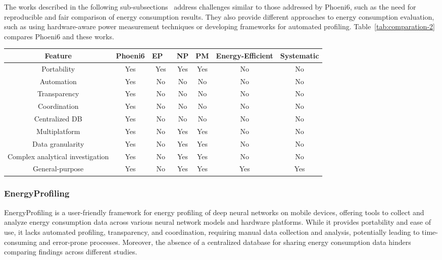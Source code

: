 The works described in the following sub-subsections~\cite{liu2022energyprofiling,li2022neuralpower,chen2021powermeter,zhang2021energyefficient,wang2020systematic} address challenges similar to those addressed by Phoeni6, such as the need for reproducible and fair comparison of energy consumption results. They also provide different approaches to energy consumption evaluation, such as using hardware-aware power measurement techniques or developing frameworks for automated profiling. Table~\ref{tab:comparation-2} compares Phoeni6 and these works.

\begin{table*}[htbp]
\centering
\caption{Feature comparison between Phoeni6 and other frameworks, emphasizing advantages in portability and automation. EP = EnergyProfilin, NP = NeuralPower, PM = PowerMete.}
\begin{tabular}{|c|c|c|c|c|c|c|}
\hline
Feature & Phoeni6 & EP ~\cite{liu2022energyprofiling}& NP\cite{li2022neuralpower} & PM \cite{chen2021powermeter}& Energy-Efficient \cite{zhang2021energyefficient} & Systematic \cite{wang2020systematic}\\
\hline
Portability & Yes & Yes & Yes & Yes & No & No \\\hline
Automation & Yes & No & No & No & No & No \\\hline
Transparency & Yes & No & No & No & No & No \\\hline
Coordination & Yes & No & No & No & No & No \\\hline
Centralized DB & Yes & No & No & No & No & No \\\hline
Multiplatform & Yes & No & Yes & Yes & No & No \\\hline
Data granularity & Yes & No & Yes & Yes & No & No \\\hline
Complex analytical investigation & Yes & No & Yes & Yes & No & No \\\hline
General-purpose & Yes & No & Yes & Yes & Yes & Yes \\
\hline
\end{tabular}
\label{tab:comparation-2}
\end{table*}

\subsubsection{EnergyProfiling \cite{liu2022energyprofiling}} EnergyProfiling is a user-friendly framework for energy profiling of deep neural networks on mobile devices, offering tools to collect and analyze energy consumption data across various neural network models and hardware platforms. While it provides portability and ease of use, it lacks automated profiling, transparency, and coordination, requiring manual data collection and analysis, potentially leading to time-consuming and error-prone processes. Moreover, the absence of a centralized database for sharing energy consumption data hinders comparing findings across different studies.

